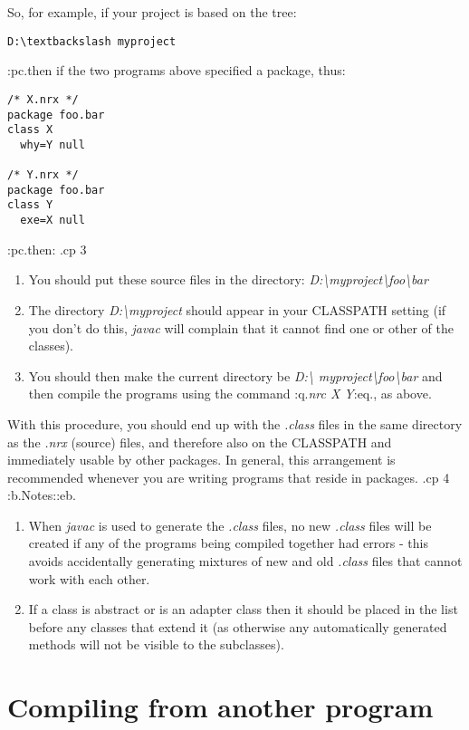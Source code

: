 So, for example, if your project is based on the tree:
\begin{verbatim}
D:\textbackslash myproject
\end{verbatim}
:pc.then if the two programs above specified a package, thus:
\begin{verbatim}
/* X.nrx */
package foo.bar
class X
  why=Y null

/* Y.nrx */
package foo.bar
class Y
  exe=X null
\end{verbatim}
:pc.then:
.cp 3
\begin{enumerate}
\item
You should put these source files in the directory:
\emph{D:\textbackslash myproject\textbackslash foo\textbackslash bar}
\item
The directory \emph{D:\textbackslash myproject} should appear in your CLASSPATH
setting (if you don't do this, \emph{javac} will complain that it cannot
find one or other of the classes).
\item
You should then make the current directory be \emph{D:\textbackslash
myproject\textbackslash foo\textbackslash bar}
and then compile the programs using the command :q.\emph{nrc X Y}:eq.,
as above.
\end{enumerate}

With this procedure, you should end up with the \emph{.class} files in
the same directory as the \emph{.nrx} (source) files, and therefore also
on the CLASSPATH and immediately usable by other packages.  In general,
this arrangement is recommended whenever you are writing programs that
reside in packages.
.cp 4
:b.Notes::eb.
\begin{enumerate}
\item
When \emph{javac} is used to generate the \emph{.class} files, no
new \emph{.class} files will be created if any of the programs being
compiled together had errors - this avoids accidentally generating
mixtures of new and old \emph{.class} files that cannot work with each
other.
\item
If a class is abstract or is an adapter class then it should be placed
in the list before any classes that extend it (as otherwise any
automatically generated methods will not be visible to the subclasses).
\end{enumerate}

\section{Compiling from another program}

